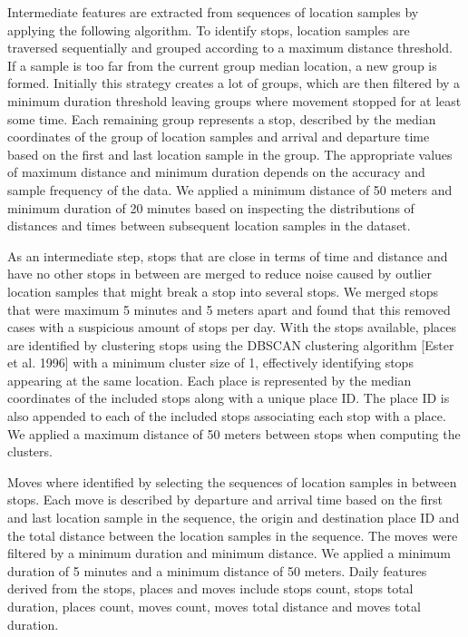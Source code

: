 Intermediate features are extracted from sequences of location samples by applying the following algorithm. To identify stops, location samples are traversed sequentially and grouped according to a maximum distance threshold. If a sample is too far from the current group median location, a new group is formed. Initially this strategy creates a lot of groups, which are then filtered by a minimum duration threshold leaving groups where movement stopped for at least some time. Each remaining group represents a stop, described by the median coordinates of the group of location samples and arrival and departure time based on the first and last location sample in the group. The appropriate values of maximum distance and minimum duration depends on the accuracy and sample frequency of the data. We applied a minimum distance of 50 meters and minimum duration of 20 minutes based on inspecting the distributions of distances and times between subsequent location samples in the dataset.

As an intermediate step, stops that are close in terms of time and distance and have no other stops in between are merged to reduce noise caused by outlier location samples that might break a stop into several stops. We merged stops that were maximum 5 minutes and 5 meters apart and found that this removed cases with a suspicious amount of stops per day. With the stops available, places are identified by clustering stops using the DBSCAN clustering algorithm [Ester et al. 1996] with a minimum cluster size of 1, effectively identifying stops appearing at the same location. Each place is represented by the median coordinates of the included stops along with a unique place ID. The place ID is also appended to each of the included stops associating each stop with a place. We applied a maximum distance of 50 meters between stops when computing the clusters.

Moves where identified by selecting the sequences of location samples in between stops. Each move is described by departure and arrival time based on the first and last location sample in the sequence, the origin and destination place ID and the total distance between the location samples in the sequence. The moves were filtered by a minimum duration and minimum distance. We applied a minimum duration of 5 minutes and a minimum distance of 50 meters. Daily features derived from the stops, places and moves include stops count, stops total duration, places count, moves count, moves total distance and moves total duration.
